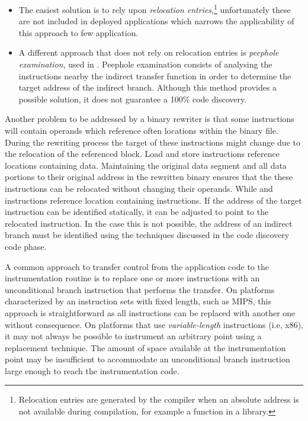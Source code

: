 \begin{itemize}
\item The easiest solution is to rely upon \emph{relocation entries},\footnote{Relocation entries are generated by the compiler when an absolute address is not available during compilation, for example a function in a library.} unfortunately these are not included in deployed applications which narrows the applicability of this approach to few application. %

\item A different approach that does not rely on relocation entries is \emph{peephole examination},  used  in \cite{PEBIL}. Peephole examination consists of analysing the instructions nearby the indirect transfer function  in order to determine the target address of the indirect branch. Although this method provides a possible solution, it does not guarantee a 100\% code discovery. 
\end{itemize}  
    

Another problem to be addressed by a binary rewriter is that some instructions will contain operands which reference often locations within the binary file. During the rewriting process the target of these instructions might change due to the relocation of the referenced block. Load and store instructions reference locations containing data. Maintaining the original data segment and all data portions to their original address in the rewritten binary ensures that the these instructions can be relocated without changing their operands. While  and  instructions reference location containing instructions. If the address of the target instruction can be identified statically, it can be adjusted to point to the relocated instruction. In the case this is not possible, the address of an indirect branch must be identified using the techniques discussed in the code discovery code phase. 


A common approach to transfer control from the application code to the instrumentation routine is to replace one or more instructions with an unconditional branch instruction that performs the transfer. On platforms characterized by an instruction sets with fixed length, such as MIPS, this approach is straightforward as all instructions can be replaced with another one without consequence. On platforms that use  \emph{variable-length} instructions (i.e, x86), it may not always be possible to instrument an arbitrary point using a replacement technique. The amount of space available at the instrumentation point may be insufficient to accommodate an unconditional branch instruction large enough to reach the instrumentation code. 


